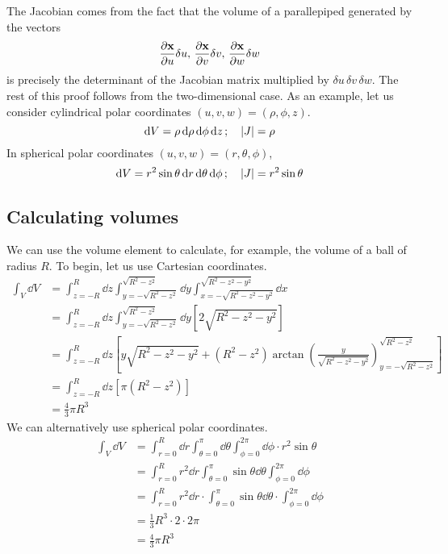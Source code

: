 \noindent The Jacobian comes from the fact that the volume of a parallepiped generated by the vectors
\[
	\frac{\partial \vb x}{\partial u} \delta u,\,\frac{\partial \vb x}{\partial v} \delta v,\,\frac{\partial \vb x}{\partial w} \delta w
\]
is precisely the determinant of the Jacobian matrix multiplied by \(\delta u\,\delta v\,\delta w\).
The rest of this proof follows from the two-dimensional case.
As an example, let us consider cylindrical polar coordinates \((u, v, w) = (\rho, \phi, z)\).
\[
	\dd{V} = \rho \dd{\rho} \dd{\phi} \dd{z};\quad \abs{J} = \rho
\]
In spherical polar coordinates \((u, v, w) = (r, \theta, \phi)\),
\[
	\dd{V} = r^2 \sin\theta \dd{r} \dd{\theta} \dd{\phi};\quad \abs{J} = r^2\sin\theta
\]

\subsection{Calculating volumes}
We can use the volume element to calculate, for example, the volume of a ball of radius \(R\).
To begin, let us use Cartesian coordinates.
\begin{align*}
	\int_V \dd{V} & = \int_{z=-R}^R \dd{z} \int_{y = -\sqrt{R^2 - z^2}}^{\sqrt{R^2 - z^2}} \dd{y} \int_{x = -\sqrt{R^2 - z^2 - y^2}}^{\sqrt{R^2 - z^2 - y^2}} \dd{x}                             \\
	              & = \int_{z=-R}^R \dd{z} \int_{y = -\sqrt{R^2 - z^2}}^{\sqrt{R^2 - z^2}} \dd{y} \left[ 2\sqrt{R^2 - z^2 - y^2} \right]                                                         \\
	              & = \int_{z=-R}^R \dd{z} \left[ y\sqrt{R^2 - z^2 - y^2} + (R^2 - z^2) \arctan \left( \frac{y}{\sqrt{R^2 - z^2 - y^2}} \right)_{y=-\sqrt{R^2 - z^2}}^{\sqrt{R^2 - z^2}} \right] \\
	              & = \int_{z=-R}^R \dd{z} \left[ \pi (R^2 - z^2) \right]                                                                                                                        \\
	              & = \frac{4}{3}\pi R^3
\end{align*}
We can alternatively use spherical polar coordinates.
\begin{align*}
	\int_V \dd{V} & = \int_{r=0}^R \dd{r} \int_{\theta=0}^\pi \dd{\theta} \int_{\phi=0}^{2\pi} \dd{\phi} \cdot r^2 \sin\theta     \\
	              & = \int_{r=0}^R r^2\dd{r} \int_{\theta=0}^\pi \sin\theta\dd{\theta} \int_{\phi=0}^{2\pi} \dd{\phi}             \\
	              & = \int_{r=0}^R r^2\dd{r} \cdot \int_{\theta=0}^\pi \sin\theta\dd{\theta} \cdot \int_{\phi=0}^{2\pi} \dd{\phi} \\
	              & = \frac{1}{3}R^3 \cdot 2 \cdot 2 \pi                                                                          \\
	              & = \frac{4}{3}\pi R^3
\end{align*}
